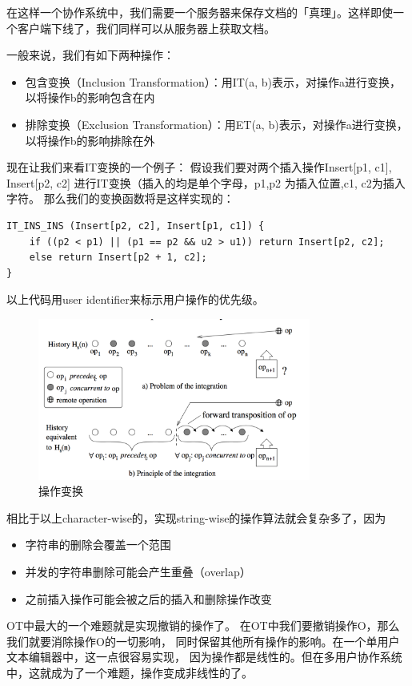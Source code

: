 \documentclass[11pt]{ctexart}
\begin{document}
在这样一个协作系统中，我们需要一个服务器来保存文档的「真理」。这样即使一个客户端下线了，我们同样可以从服务器上获取文档。

一般来说，我们有如下两种操作：
\begin{itemize}
    \item 包含变换（Inclusion Transformation）：用IT(a, b)表示，对操作a进行变换，以将操作b的影响包含在内
    \item 排除变换（Exclusion Transformation）：用ET(a, b)表示，对操作a进行变换，以将操作b的影响排除在外
\end{itemize}

现在让我们来看IT变换的一个例子：
假设我们要对两个插入操作Insert[p1, c1], Insert[p2, c2]
进行IT变换（插入的均是单个字母，p1,p2 为插入位置,c1, c2为插入字符。
那么我们的变换函数将是这样实现的：

\begin{verbatim}
IT_INS_INS (Insert[p2, c2], Insert[p1, c1]) {
    if ((p2 < p1) || (p1 == p2 && u2 > u1))	return Insert[p2, c2];
    else return Insert[p2 + 1, c2];
}
\end{verbatim}
以上代码用user identifier来标示用户操作的优先级。

\begin{figure}[H]
    \begin{center}
    \includegraphics[width=0.8\textwidth]{figures/ot_transformation.png}
    \caption{操作变换}
    \end{center}
\end{figure}

相比于以上character-wise的，实现string-wise的操作算法就会复杂多了，因为
\begin{itemize}
    \item 字符串的删除会覆盖一个范围
    \item 并发的字符串删除可能会产生重叠（overlap）
    \item 之前插入操作可能会被之后的插入和删除操作改变
\end{itemize}
OT中最大的一个难题就是实现撤销的操作了。
在OT中我们要撤销操作O，那么我们就要消除操作O的一切影响，
同时保留其他所有操作的影响。在一个单用户文本编辑器中，这一点很容易实现，
因为操作都是线性的。但在多用户协作系统中，这就成为了一个难题，操作变成非线性的了。
\end{document}
